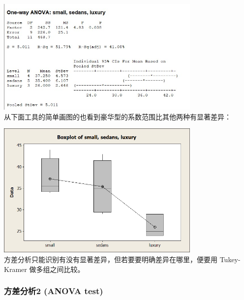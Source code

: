 
\includegraphics[width=10cm]{5anovaResultScreenshot_2022-07-24_104352.jpg}\\
从下面工具的简单画图的也看到豪华型的系数范围比其他两种有显著差异：


\includegraphics[width=10cm]{5anovaBoxplot_of_small_sedans_luxury.jpg}\\
方差分析只能识别有没有显著差异，但若要要明确差异在哪里，便要用
Tukey-Kramer 做多组之间比较。


\hypertarget{ux65b9ux5deeux5206ux67902-anova-test}{%
\subsubsection{方差分析2 (ANOVA
test)}\label{ux65b9ux5deeux5206ux67902-anova-test}}

